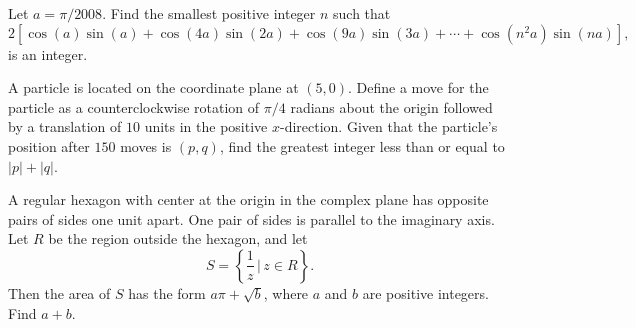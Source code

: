 \documentclass[11pt]{article}
\theoremstyle{definition}
\begin{document}
\begin{question}[name={2008 AIME II, \href{https://artofproblemsolving.com/community/c4p1088468}{Problem 8}}]
	Let $ a=\pi/2008$. Find the smallest positive integer $ n$ such that
	\[ 2[\cos(a)\sin(a)+\cos(4a)\sin(2a)+\cos(9a)\sin(3a)+\cdots+\cos(n^2a)\sin(na)],\]is an integer.
\end{question}


%	













\begin{question}[name={2008 AIME II, \href{https://artofproblemsolving.com/community/c4p1088469}{Problem 9}}]
	A particle is located on the coordinate plane at $ (5,0)$. Define a move for the particle as a counterclockwise rotation of $ \pi/4$ radians about the origin followed by a translation of $ 10$ units in the positive $ x$-direction. Given that the particle's position after $ 150$ moves is $ (p,q)$, find the greatest integer less than or equal to $|p|+|q|$.
\end{question}


%	












\begin{question}[name={2008 AIME II, \href{https://artofproblemsolving.com/community/c4p1088478}{Problem 13}}]
	A regular hexagon with center at the origin in the complex plane has opposite pairs of sides one unit apart. One pair of sides is parallel to the imaginary axis. Let $ R$ be the region outside the hexagon, and let $$ S=\left\{\frac{1}{z}\,\big| \, z\in  R\right\}.$$ Then the area of $ S$ has the form $ a\pi+\sqrt{b}$, where $ a$ and $ b$ are positive integers. Find $a+b$.	
\end{question}


%	
\end{document}
